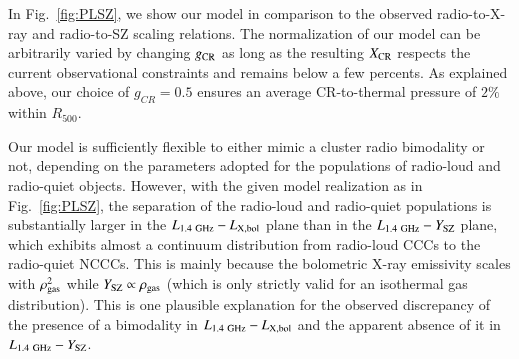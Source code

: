 \documentclass[useAMS,usenatbib]{mn2e}
\begin{document}
In Fig.~\ref{fig:PLSZ}, we show our model in comparison to the observed
radio-to-X-ray and radio-to-SZ scaling relations. The normalization of our model
can be arbitrarily varied by changing $g_{{\mathrm{CR}}}$ as long as the resulting
$X_{{\mathrm{CR}}}$ respects the current observational constraints
and remains below a few percents. As
explained above, our choice of $g_{CR}=0.5$ ensures an average CR-to-thermal
pressure of $2\%$ within $R_{500}$.  

Our model is sufficiently flexible to either mimic a cluster radio bimodality or not, depending 
on the parameters adopted for the populations of radio-loud and radio-quiet
objects. However, with the given model realization as in Fig.~\ref{fig:PLSZ}, the
separation of the radio-loud and radio-quiet populations is substantially larger in
the $L_{1.4~{\mathrm{GHz}}}-L_{{\mathrm{X,bol}}}$ plane than in the
$L_{1.4~{\mathrm{GHz}}}-Y_{{\mathrm{SZ}}}$ plane, which exhibits almost a continuum
distribution from radio-loud CCCs to the radio-quiet NCCCs. This is mainly
because the bolometric X-ray emissivity scales with $\rho_{{\mathrm{gas}}}^2$ while
$Y_{{\mathrm{SZ}}}\propto\rho_{{\mathrm{gas}}}$ (which is only strictly valid for an
isothermal gas distribution). 
This is one plausible explanation for the observed discrepancy of the presence of a
bimodality in $L_{1.4~{\mathrm{GHz}}}-L_{{\mathrm{X,bol}}}$ and the apparent absence of it
in $L_{1.4~{\mathrm{GHz}}}-Y_{{\mathrm{SZ}}}$. 
\end{document}
